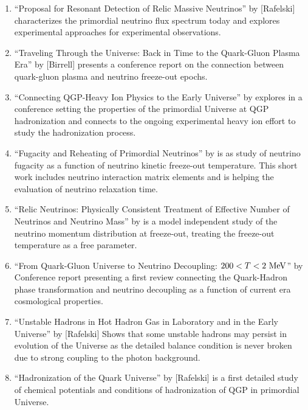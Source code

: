 \begin{enumerate}
%
\item ``Proposal for Resonant Detection of Relic Massive Neutrinos'' by [Rafelski] characterizes the primordial neutrino flux spectrum today and explores experimental approaches for experimental observations.
%
\item ``Traveling Through the Universe: Back in Time to the Quark-Gluon Plasma Era'' by [Birrell] presents a conference report on the connection between quark-gluon plasma and neutrino freeze-out epochs.
%
\item ``Connecting QGP-Heavy Ion Physics to the Early Universe'' by  explores in a conference setting the properties of the primordial Universe at QGP hadronization and connects to the ongoing experimental heavy ion effort to study the hadronization process.
%
\item ``Fugacity and Reheating of Primordial Neutrinos'' by  is as study of neutrino fugacity as a function of neutrino kinetic freeze-out temperature. This short work includes neutrino interaction matrix elements and is helping the evaluation of neutrino relaxation time. 
%
\item ``Relic Neutrinos: Physically Consistent Treatment of Effective Number of Neutrinos and Neutrino Mass'' by  is a model independent study of the neutrino momentum distribution at freeze-out, treating the freeze-out temperature as a free parameter.
%
\item ``From Quark-Gluon Universe to Neutrino Decoupling: $200 < T < 2\text{ MeV}$'' by  Conference report presenting a first review connecting the Quark-Hadron phase transformation and neutrino decoupling as a function of current era cosmological properties.
%
\item ``Unstable Hadrons in Hot Hadron Gas in Laboratory and in the Early Universe'' by [Rafelski] Shows that some unstable hadrons may persist in evolution of the Universe as the detailed balance condition is never broken due to strong coupling to the photon background.
%
\item ``Hadronization of the Quark Universe'' by [Rafelski] is a first detailed study of chemical potentials and conditions of hadronization of QGP in primordial Universe.
%
\end{enumerate}
